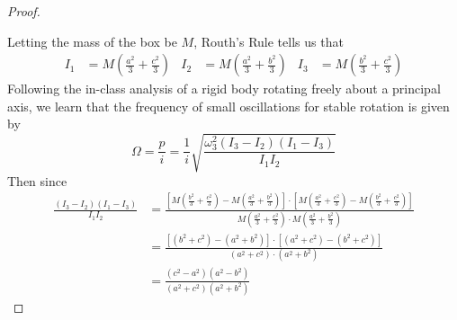 \documentclass[../psets.tex]{subfiles}
\begin{document}
\begin{enumerate}
\begin{enumerate}
\begin{proof}
\begin{center}
            \end{center}
            Letting the mass of the box be $M$, Routh's Rule tells us that
            \begin{align*}
                I_1 &= M\left( \frac{a^2}{3}+\frac{c^2}{3} \right)&
                I_2 &= M\left( \frac{a^2}{3}+\frac{b^2}{3} \right)&
                I_3 &= M\left( \frac{b^2}{3}+\frac{c^2}{3} \right)
            \end{align*}
            Following the in-class analysis of a rigid body rotating freely about a principal axis, we learn that the frequency of small oscillations for stable rotation is given by
            \begin{equation*}
                \Omega = \frac{p}{i}
                = \frac{1}{i}\sqrt{\frac{\omega_3^2(I_3-I_2)(I_1-I_3)}{I_1I_2}}
            \end{equation*}
            Then since
            \begin{align*}
                \frac{(I_3-I_2)(I_1-I_3)}{I_1I_2} &= \frac{\left[ M\left( \frac{b^2}{3}+\frac{c^2}{3} \right)-M\left( \frac{a^2}{3}+\frac{b^2}{3} \right) \right]\cdot\left[ M\left( \frac{a^2}{3}+\frac{c^2}{3} \right)-M\left( \frac{b^2}{3}+\frac{c^2}{3} \right) \right]}{M\left( \frac{a^2}{3}+\frac{c^2}{3} \right)\cdot M\left( \frac{a^2}{3}+\frac{b^2}{3} \right)}\\
                &= \frac{[(b^2+c^2)-(a^2+b^2)]\cdot[(a^2+c^2)-(b^2+c^2)]}{(a^2+c^2)\cdot(a^2+b^2)}\\
                &= \frac{(c^2-a^2)(a^2-b^2)}{(a^2+c^2)(a^2+b^2)}

\end{align*}
\end{proof}
\end{enumerate}
\end{enumerate}
\end{document}
